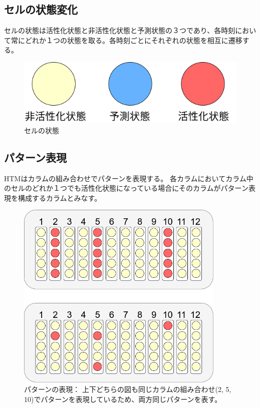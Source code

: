 \subsection{セルの状態変化}
セルの状態は活性化状態と非活性化状態と予測状態の３つであり、各時刻において常にどれか１つの状態を取る。各時刻ごとにそれぞれの状態を相互に遷移する。

\vspace{5mm}
\begin{figure}[ht]
  \begin{center}
    \includegraphics[scale=0.5]{./fig/drawing_2}
    \caption{セルの状態}
    \label{fig:cell_state}
  \end{center}
\end{figure}

\subsection{パターン表現}
HTMはカラムの組み合わせでパターンを表現する。
各カラムにおいてカラム中のセルのどれか１つでも活性化状態になっている場合にそのカラムがパターン表現を構成するカラムとみなす。

\vspace{5mm}
\begin{figure}[ht]
  \begin{center}
    \includegraphics[width=10cm]{./fig/drawing_3}
    \caption{パターンの表現： 上下どちらの図も同じカラムの組み合わせ(2, 5, 10)でパターンを表現しているため、両方同じパターンを表す。}
    \label{fig:pattern_representation}
  \end{center}
\end{figure}

